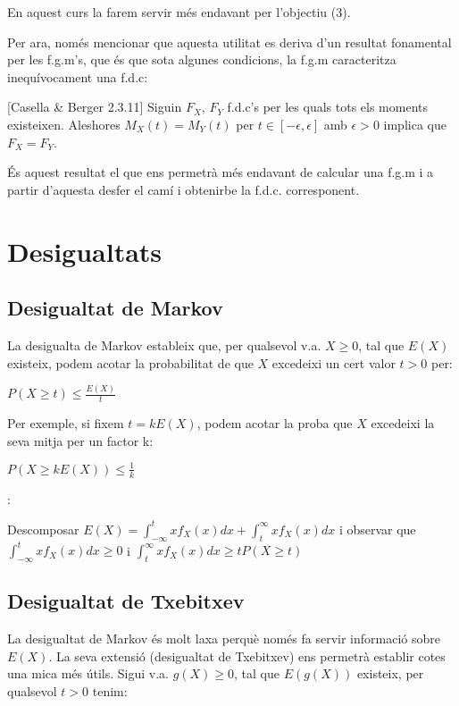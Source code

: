 \documentclass[letterpaper,10pt,english]{sphinxmanual}
\begin{document}
En aquest curs la farem servir més endavant per l’objectiu (3).

Per ara, només mencionar que aquesta utilitat es deriva d’un resultat
fonamental per les f.g.m’s, que és que sota algunes condicions, la f.g.m
caracteritza inequívocament una f.d.c:

{[}Casella \& Berger 2.3.11{]} Siguin \(F_X\), \(F_Y\) f.d.c’s per les quals
tots els moments existeixen. Aleshores \(M_X\left(t\right)=M_Y\left(t\right)\)
per \(t\in [-\epsilon, \epsilon]\) amb \(\epsilon>0\) implica que \(F_X = F_Y\).

És aquest resultat el que ens permetrà més endavant de calcular
una f.g.m i a partir d’aquesta desfer el camí i obtenir\sphinxhyphen{}be la f.d.c. corresponent.


\section{Desigualtats}
\label{\detokenize{0_Intro/0_1_Repas_probabilitat:desigualtats}}

\subsection{Desigualtat de Markov}
\label{\detokenize{0_Intro/0_1_Repas_probabilitat:desigualtat-de-markov}}
La desigualta de Markov estableix que, per qualsevol v.a. \(X \geq 0\),
tal que \(E(X)\) existeix, podem acotar la probabilitat de que \(X\)
excedeixi un cert valor \(t > 0\) per:

\(P(X \geq t) \leq \frac{E(X)}{t}\)

Per exemple, si fixem \(t = kE(X)\), podem acotar la proba que \(X\)
excedeixi la seva mitja per un factor k:

\(P(X \geq k E(X)) \leq \frac{1}{k}\)

:

Descomposar \(E(X)=\int_{-\infty}^t x f_X(x)dx + \int_t^{\infty} x f_X(x)dx\)
i observar que \(\int_{-\infty}^t x f_X(x)dx \geq 0\) i \(\int_t^{\infty} x f_X(x)dx \geq t P(X\geq t)\)


\subsection{Desigualtat de Txebitxev}
\label{\detokenize{0_Intro/0_1_Repas_probabilitat:desigualtat-de-txebitxev}}
La desigualtat de Markov és molt laxa perquè només fa servir informació sobre \(E(X)\).
La seva extensió (desigualtat de Txebitxev) ens permetrà establir cotes una mica més
útils. Sigui v.a. \(g(X) \geq 0\), tal que \(E(g(X))\) existeix, per qualsevol \(t > 0\) tenim:
\end{document}
